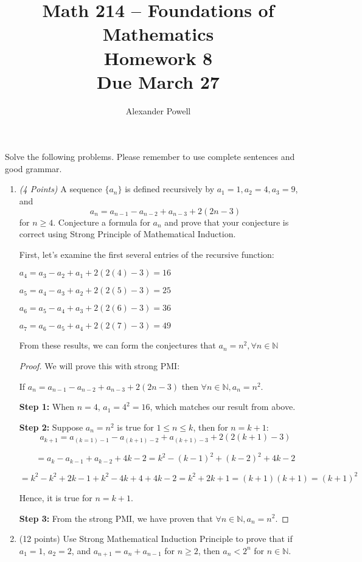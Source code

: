 \documentclass[10pt]{article} %
\title{Math 214 -- Foundations of Mathematics\\
Homework 8\\
{\large{\bf Due March 27}}}
\date{}
\author{Alexander Powell}
\newcommand{\N}{\mathbb{N}}
\newcommand{\points}[1]{{\it (#1 Points)}}
\def\blue#1{\textcolor{blue}{#1}}
\begin{document}
\maketitle

Solve the following problems.  Please remember to use complete sentences
and good grammar.


\begin{enumerate}



\item \points{4} A sequence $\{a_n\}$ is defined recursively by $a_1=1, a_2=4, a_3=9$, and $$a_n=a_{n-1}-a_{n-2}+a_{n-3}+2(2n-3)$$ for $n\ge 4$.  Conjecture a formula for $a_n$ and prove that your conjecture is correct using Strong Principle of Mathematical Induction.

\bigskip

 First, let's examine the first several entries of the recursive function:

$a_4=a_3-a_2+a_1+2(2(4)-3)=16$

$a_5=a_4-a_3+a_2+2(2(5)-3)=25$

$a_6=a_5-a_4+a_3+2(2(6)-3)=36$

$a_7=a_6-a_5+a_4+2(2(7)-3)=49$

From these results, we can form the conjectures that $a_n=n^2, \forall n \in \N$

\begin{proof} We will prove this with strong PMI:

If $a_n=a_{n-1}-a_{n-2}+a_{n-3}+2(2n-3)$ then $\forall n \in \N, a_n=n^2$.  

{\bf Step 1:} When $n=4$, $a_1=4^2=16$, which matches our result from above.  

{\bf Step 2:} Suppose $a_n=n^2$ is true for $1 \leq n \leq k$, then for $n=k+1$: 
$$a_{k+1}=a_{(k=1)-1}-a_{(k+1)-2}+a_{(k+1)-3}+2(2(k+1)-3)$$

$$=a_k-a_{k-1}+a_{k-2}+4k-2=k^2-(k-1)^2+(k-2)^2+4k-2$$

$$=k^2-k^2+2k-1+k^2-4k+4+4k-2=k^2+2k+1=(k+1)(k+1)=(k+1)^2$$

Hence, it is true for $n=k+1$.  

{\bf Step 3:} From the strong PMI, we have proven that $\forall n \in \N, a_n=n^2$.  

\end{proof}


\item (12 points)  %
Use Strong Mathematical Induction Principle to prove that if $a_1=1$, $a_2=2$,
and $a_{n+1}=a_n+a_{n-1}$ for $n\ge 2$, then $a_n<2^n$ for $n\in \N$.


\end{enumerate}
\end{document}
